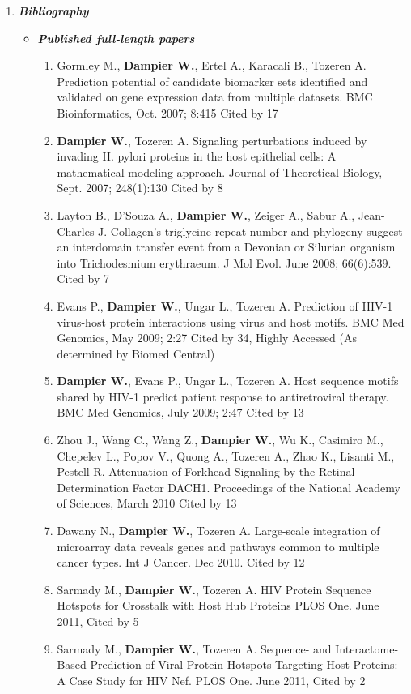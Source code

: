 \documentclass[a4paper,11pt]{article}
\begin{document}
\begin{enumerate}
 \item {\LARGE \itshape \bfseries Bibliography}
 \begin{itemize}
  \item[] {\Large \bfseries \itshape Published full-length papers}
  \begin{enumerate}[label=\arabic{enumii}.]
   \item Gormley M., \textbf{Dampier W.}, Ertel A., Karacali B., Tozeren A. Prediction potential of candidate biomarker sets identified and validated on gene expression data from multiple datasets. BMC Bioinformatics, Oct. 2007; 8:415 Cited by 17
   \item \textbf{Dampier W.}, Tozeren A. Signaling perturbations induced by invading H. pylori proteins in the host epithelial cells: A mathematical modeling approach. Journal of Theoretical Biology, Sept. 2007; 248(1):130 Cited by 8
   \item Layton B., D'Souza A., \textbf{Dampier W.}, Zeiger A., Sabur A., Jean-Charles J. Collagen's triglycine repeat number and phylogeny suggest an interdomain transfer event from a Devonian or Silurian organism into Trichodesmium erythraeum. J Mol Evol. June 2008; 66(6):539. Cited by 7
   \item Evans P., \textbf{Dampier W.}, Ungar L., Tozeren A. Prediction of HIV-1 virus-host protein interactions using virus and host motifs. BMC Med Genomics, May 2009; 2:27 Cited by 34, Highly Accessed (As determined by Biomed Central)
   \item \textbf{Dampier W.}, Evans P., Ungar L., Tozeren A. Host sequence motifs shared by HIV-1 predict patient response to antiretroviral therapy. BMC Med Genomics, July 2009; 2:47 Cited by 13
   \item Zhou J., Wang C., Wang Z., \textbf{Dampier W.}, Wu K., Casimiro M., Chepelev L., Popov V., Quong A., Tozeren A., Zhao K., Lisanti M., Pestell R. Attenuation of Forkhead Signaling by the Retinal Determination Factor DACH1. Proceedings of the National Academy of Sciences, March 2010 Cited by 13
   \item Dawany N., \textbf{Dampier W.}, Tozeren A. Large-scale integration of microarray data reveals genes and pathways common to multiple cancer types. Int J Cancer. Dec 2010. Cited by 12
   \item Sarmady M., \textbf{Dampier W.}, Tozeren A. HIV Protein Sequence Hotspots for Crosstalk with Host Hub Proteins PLOS One. June 2011, Cited by 5
   \item Sarmady M., \textbf{Dampier W.}, Tozeren A. Sequence- and Interactome- Based Prediction of Viral Protein Hotspots Targeting Host Proteins: A Case Study for HIV Nef. PLOS One. June 2011, Cited by 2

\end{enumerate}
\end{itemize}
\end{enumerate}
\end{document}
